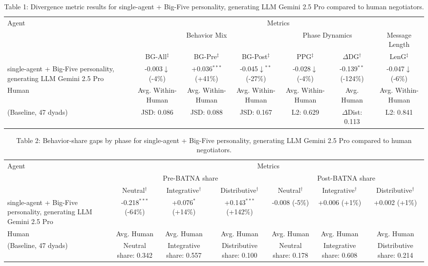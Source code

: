 \begin{table}[t]
\centering
\begin{tabular}{lcccccc}
\toprule
\multirow{3}{*}{Agent} & \multicolumn{6}{c}{Metrics} \\
\cmidrule(lr){2-7}
 & \multicolumn{3}{c}{Behavior Mix} & \multicolumn{2}{c}{Phase Dynamics} & \multicolumn{1}{c}{Message Length} \\
\cmidrule(lr){2-4} \cmidrule(lr){5-6} \cmidrule(lr){7-7}
 & BG-All$^\ddagger$ & BG-Pre$^\ddagger$ & BG-Post$^\ddagger$ & PPG$^\ddagger$ & $\Delta$DG$^\dagger$ & LenG$^\ddagger$ \\
\midrule
single-agent + Big-Five personality, generating LLM Gemini 2.5 Pro & -0.003$\downarrow$ (-4\%) & +0.036$^{***}$ (+41\%) & -0.045$\downarrow$$^{**}$ (-27\%) & -0.028$\downarrow$ (-4\%) & -0.139$^{**}$ (-124\%) & -0.047$\downarrow$ (-6\%) \\
\midrule
Human & Avg. Within-Human & Avg. Within-Human & Avg. Within-Human & Avg. Within-Human & Avg. Human & Avg. Within-Human \\
(Baseline, 47 dyads) & JSD: 0.086 & JSD: 0.088 & JSD: 0.167 & L2: 0.629 & $\Delta$Dist: 0.113 & L2: 0.841 \\
\bottomrule
\end{tabular}
\caption{Table 1: Divergence metric results for single-agent + Big-Five personality, generating LLM Gemini 2.5 Pro compared to human negotiators.}
\end{table}

\begin{table}[t]
\centering
\begin{tabular}{lcccccc}
\toprule
\multirow{3}{*}{Agent} & \multicolumn{6}{c}{Metrics} \\
\cmidrule(lr){2-7}
 & \multicolumn{3}{c}{Pre-BATNA share} & \multicolumn{3}{c}{Post-BATNA share} \\
\cmidrule(lr){2-4} \cmidrule(lr){5-7}
 & Neutral$^\dagger$ & Integrative$^\dagger$ & Distributive$^\dagger$ & Neutral$^\dagger$ & Integrative$^\dagger$ & Distributive$^\dagger$ \\
\midrule
single-agent + Big-Five personality, generating LLM Gemini 2.5 Pro & -0.218$^{***}$ (-64\%) & +0.076$^{*}$ (+14\%) & +0.143$^{***}$ (+142\%) & -0.008 (-5\%) & +0.006 (+1\%) & +0.002 (+1\%) \\
\midrule
Human & Avg. Human & Avg. Human & Avg. Human & Avg. Human & Avg. Human & Avg. Human \\
(Baseline, 47 dyads) & Neutral share: 0.342 & Integrative share: 0.557 & Distributive share: 0.100 & Neutral share: 0.178 & Integrative share: 0.608 & Distributive share: 0.214 \\
\bottomrule
\end{tabular}
\caption{Table 2: Behavior-share gaps by phase for single-agent + Big-Five personality, generating LLM Gemini 2.5 Pro compared to human negotiators.}
\end{table}
